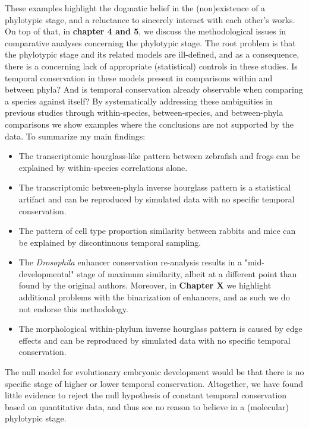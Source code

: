 These examples highlight the dogmatic belief in the (non)existence of a phylotypic stage, and a reluctance to sincerely interact with each other's works. On top of that, in \textbf{chapter 4 and 5}, we discuss the methodological issues in comparative analyses concerning the phylotypic stage. The root problem is that the phylotypic stage and its related models are ill-defined, and as a consequence, there is a concerning lack of appropriate (statistical) controls in these studies. Is temporal conservation in these models present in comparisons within and between phyla? And is temporal conservation already observable when comparing a species against itself? By systematically addressing these ambiguities in previous studies through within-species, between-species, and between-phyla comparisons we show examples where the conclusions are not supported by the data. To summarize my main findings:
\begin{itemize}
    \item The transcriptomic hourglass-like pattern between zebrafish and frogs\cite{marletaz2018} can be explained by within-species correlations alone.
    \item The transcriptomic between-phyla inverse hourglass pattern\cite{Levin2016} is a statistical artifact and can be reproduced by simulated data with no specific temporal conservation.
    \item The pattern of cell type proportion similarity between rabbits and mice\cite{Mayshar2023} can be explained by discontinuous temporal sampling.
    \item The \textit{Drosophila} enhancer conservation re-analysis results in a "mid-developmental" stage of maximum similarity, albeit at a different point than found by the original authors. Moreover, in \textbf{Chapter X} we highlight additional problems with the binarization of enhancers, and as such we do not endorse this methodology.
    \item  The morphological within-phylum inverse hourglass pattern is caused by edge effects and can be reproduced by simulated data with no specific temporal conservation.
\end{itemize}
\noindent
The null model for evolutionary embryonic development would be that there is no specific stage of higher or lower temporal conservation. Altogether, we have found little evidence to reject the null hypothesis of constant temporal conservation based on quantitative data, and thus see no reason to believe in a (molecular) phylotypic stage.

